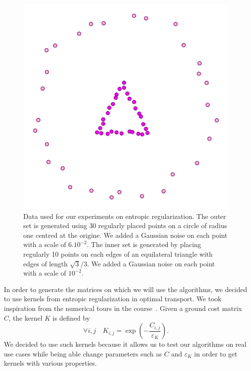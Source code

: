 \begin{figure}[H]
    \centering
    \includegraphics[width=.3\textwidth]{figures/data_sinkhorn}
    \caption{Data used for our experiments on entropic regularization. The outer set is generated using 30 regularly placed points on a circle of radius one centred at the origine. We added a Gaussian noise on each point with a scale of \(6.10^{-2}\). The inner set is generated by placing regularly 10 points on each edges of an equilateral triangle with edges of length \(\sqrt{3}/3\). We added a Gaussian noise on each point with a scale of \(10^{-2}\).}\label{data}
\end{figure}

In order to generate the matrices on which we will use the algorithms, we decided to use kernels from entropic regularization in optimal transport. We took inspiration from the numerical tours in the course~\cite{peyre2011numerical}. Given a ground cost matrix \(C\), the kernel \(K\) is defined by 
\[
    \forall i,j \quad K_{i,j} = \exp\left( -\dfrac{C_{i,j}}{\varepsilon_K} \right).
\]
We decided to use such kernels because it allows us to test our algorithms on real use cases while being able change parameters such as \(C\) and \(\varepsilon_K\) in order to get kernels with various properties.

